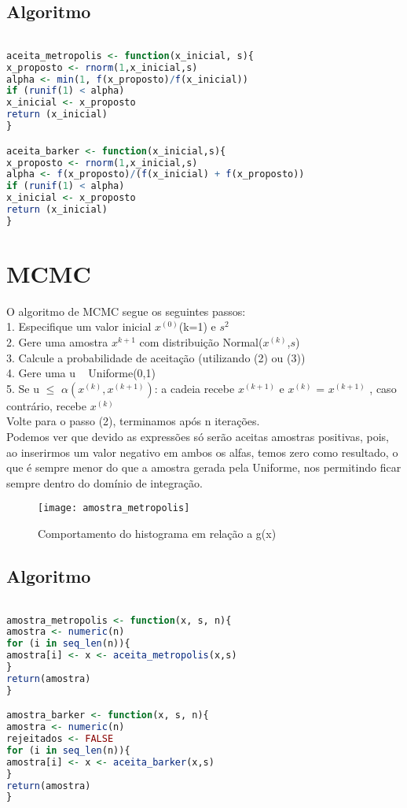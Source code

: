 \documentclass{article}
\begin{document}
\subsection{Algoritmo}
\begin{lstlisting}[language=R]

aceita_metropolis <- function(x_inicial, s){
x_proposto <- rnorm(1,x_inicial,s)
alpha <- min(1, f(x_proposto)/f(x_inicial))
if (runif(1) < alpha)
x_inicial <- x_proposto
return (x_inicial)
}

aceita_barker <- function(x_inicial,s){
x_proposto <- rnorm(1,x_inicial,s)
alpha <- f(x_proposto)/(f(x_inicial) + f(x_proposto))
if (runif(1) < alpha)
x_inicial <- x_proposto
return (x_inicial)
}
\end{lstlisting}
\section{MCMC}
O algoritmo de MCMC segue os seguintes passos:\\
1. Especifique um valor inicial $x^{(0)}$(k=1) e $s^2$\\
2. Gere uma amostra $x^{k+1}$ com distribuição Normal($x^{(k)}$,$s$)\\
3. Calcule a probabilidade de aceitação (utilizando (2) ou (3))\\
4. Gere uma u ~ Uniforme(0,1)\\
5. Se u $\leq$ $\alpha(x^{(k)},x^{(k+1)})$: a cadeia recebe $x^{(k+1)}$ e $x^{(k)}$  = $x^{(k+1)}$ , caso contrário, recebe $x^{(k)}$\\
Volte para o passo (2), terminamos após n iterações.\\
Podemos ver que devido as expressões só serão aceitas amostras positivas, pois, ao inserirmos um valor negativo em ambos os alfas, temos zero como resultado, o que é sempre menor do que a amostra gerada pela Uniforme, nos permitindo ficar sempre dentro do domínio de integração. 

\begin{figure}[h]
	\begin{center}
		\texttt{[image: amostra\_metropolis]}
		\caption{Comportamento do histograma em relação a g(x)}
	\end{center}
\end{figure}

\subsection{Algoritmo}
\begin{lstlisting}[language = R]

amostra_metropolis <- function(x, s, n){
amostra <- numeric(n)
for (i in seq_len(n)){
amostra[i] <- x <- aceita_metropolis(x,s)
}
return(amostra)
}

amostra_barker <- function(x, s, n){
amostra <- numeric(n)
rejeitados <- FALSE
for (i in seq_len(n)){
amostra[i] <- x <- aceita_barker(x,s)
}
return(amostra)
}
\end{lstlisting}
\end{document}
